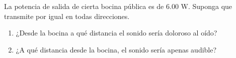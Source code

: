 \item La potencia de salida de cierta bocina pública es de 6.00 W. Suponga que transmite por igual en todas direcciones.
\begin{enumerate}
    \item ¿Desde la bocina a qué distancia el sonido sería doloroso al oído?
    \item ¿A qué distancia desde la bocina, el sonido sería apenas audible?
\end{enumerate}